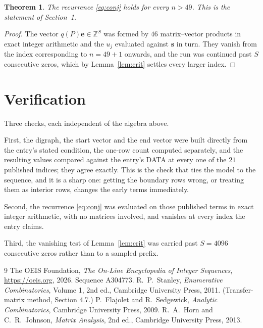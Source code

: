 \documentclass[11pt,a4paper]{article}
\theoremstyle{plain}
\newtheorem{theorem}{Theorem}
\theoremstyle{definition}
\begin{document}
\begin{theorem}
The recurrence \eqref{eq:conj} holds for every $n>49$. This is the statement of
Section~1.
\end{theorem}

\begin{proof}
The vector $q(P)\mathbf{e}\in\mathbb{Z}^{S}$ was formed by $46$ matrix--vector
products in exact integer arithmetic and the $u_j$ evaluated against $\mathbf{s}$ in turn.
They vanish from the index corresponding to $n=49+1$ onwards, and the run was continued
past $S$ consecutive zeros, which by Lemma~\ref{lem:crit} settles every larger index.
\end{proof}

\section{Verification}

Three checks, each independent of the algebra above.

First, the digraph, the start vector and the end vector were built directly from the
entry's stated condition, the one-row count computed separately, and the resulting values
compared against the entry's DATA at every one of the $21$ published indices; they
agree exactly. This is the check that ties the model to the sequence, and it is a sharp one:
getting the boundary rows wrong, or treating them as interior rows, changes the early terms
immediately.

Second, the recurrence \eqref{eq:conj} was evaluated on those published terms in exact
integer arithmetic, with no matrices involved, and vanishes at every index the entry claims.

Third, the vanishing test of Lemma~\ref{lem:crit} was carried past $S=4096$ consecutive
zeros rather than to a sampled prefix.

\begin{thebibliography}{9}
 The OEIS Foundation, \emph{The On-Line Encyclopedia of Integer
Sequences}, \url{https://oeis.org}, 2026. Sequence A304773.
 R.~P.~Stanley, \emph{Enumerative Combinatorics}, Volume 1, 2nd ed.,
Cambridge University Press, 2011. (Transfer-matrix method, Section 4.7.)
 P.~Flajolet and R.~Sedgewick, \emph{Analytic Combinatorics}, Cambridge
University Press, 2009.
 R.~A.~Horn and C.~R.~Johnson, \emph{Matrix Analysis}, 2nd ed., Cambridge
University Press, 2013.
\end{thebibliography}
\end{document}
